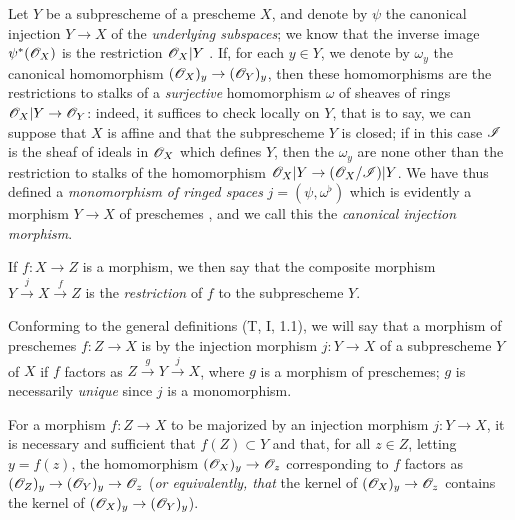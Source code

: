 \begin{env}[4.1.7]
\label{1.4.1.7}
Let $Y$ be a subprescheme of a prescheme $X$, and denote by $\psi$ the canonical injection $Y\to X$ of the \emph{underlying subspaces}; we know that the inverse image $\psi^*(\mathscr{O}_X)$ is the restriction $\mathscr{O}_X|Y$ .
If, for each $y\in Y$, we denote by $\omega_y$ the canonical homomorphism $(\OO_X)_y\to(\OO_Y)_y$, then these homomorphisms are the restrictions to stalks of a \emph{surjective} homomorphism $\omega$ of sheaves of rings $\OO_X|Y\to\OO_Y$: indeed, it suffices to check locally on $Y$, that is to say, we can suppose that $X$ is affine and that the subprescheme $Y$ is closed; if in this case $\mathscr{I}$ is the sheaf of ideals in $\mathscr{O}_X$ which defines $Y$, then the $\omega_y$ are none other than the restriction to stalks of the homomorphism $\OO_X|Y\to(\OO_X/\sh{I})|Y$.
We have thus defined a \emph{monomorphism of ringed spaces}  $j=(\psi,\omega^\flat)$ which is evidently a morphism $Y\to X$ of preschemes , and we call this the \emph{canonical injection morphism}.

If $f:X\to Z$ is a morphism, we then say that the composite morphism $Y\xrightarrow{j}X\xrightarrow{f}Z$ is the \emph{restriction} of $f$ to the subprescheme $Y$.
\end{env}

\begin{env}[4.1.8]
\label{1.4.1.8}
Conforming to the general definitions (T, I, 1.1), we will say that a morphism of preschemes $f:Z\to X$ is  by the injection morphism $j:Y\to X$ of a subprescheme $Y$ of $X$ if $f$ factors as $Z\xrightarrow{g}Y\xrightarrow{j}X$, where $g$ is a morphism of preschemes; $g$ is necessarily \emph{unique} since $j$ is a monomorphism.
\end{env}

\begin{prop}[4.1.9]
\label{1.4.1.9}
For a morphism $f:Z\to X$ to be majorized by an injection morphism $j:Y\to X$, it is necessary and sufficient that $f(Z)\subset Y$ and that, for all $z\in Z$, letting $y=f(z)$, the homomorphism $(\OO_X)_y\to\OO_z$ corresponding to $f$ factors as $(\OO_Z)_y\to(\OO_Y)_y\to\OO_z$ (\emph{or equivalently, that} the kernel of $(\OO_X)_y\to\OO_z$ contains the kernel of $(\OO_X)_y\to(\OO_Y)_y$).
\end{prop}

